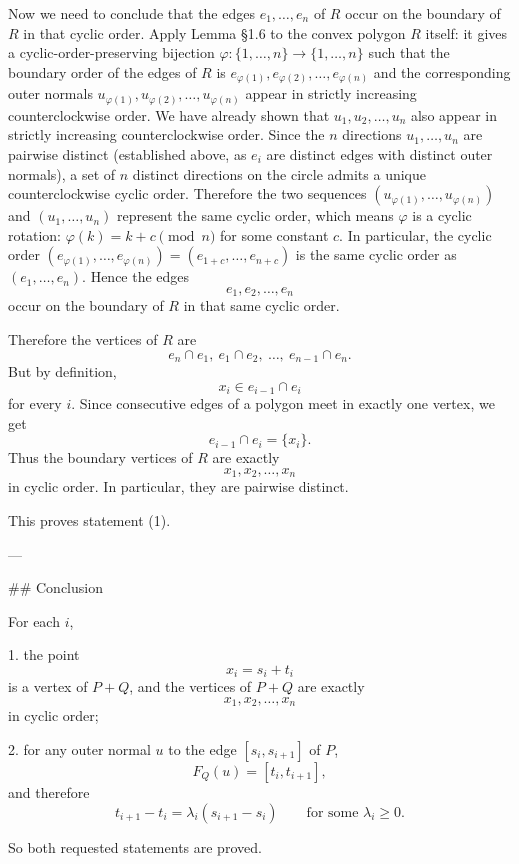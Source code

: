 Now we need to conclude that the edges \(e_1,\dots,e_n\) of \(R\) occur on the boundary of \(R\) in that cyclic order. Apply Lemma §1.6 to the convex polygon \(R\) itself: it gives a cyclic-order-preserving bijection \(\varphi\colon\{1,\dots,n\}\to\{1,\dots,n\}\) such that the boundary order of the edges of \(R\) is \(e_{\varphi(1)},e_{\varphi(2)},\dots,e_{\varphi(n)}\) and the corresponding outer normals \(u_{\varphi(1)},u_{\varphi(2)},\dots,u_{\varphi(n)}\) appear in strictly increasing counterclockwise order. We have already shown that \(u_1,u_2,\dots,u_n\) also appear in strictly increasing counterclockwise order. Since the \(n\) directions \(u_1,\dots,u_n\) are pairwise distinct (established above, as \(e_i\) are distinct edges with distinct outer normals), a set of \(n\) distinct directions on the circle admits a unique counterclockwise cyclic order. Therefore the two sequences \((u_{\varphi(1)},\dots,u_{\varphi(n)})\) and \((u_1,\dots,u_n)\) represent the same cyclic order, which means \(\varphi\) is a cyclic rotation: \(\varphi(k)=k+c\pmod n\) for some constant \(c\). In particular, the cyclic order \((e_{\varphi(1)},\dots,e_{\varphi(n)})=(e_{1+c},\dots,e_{n+c})\) is the same cyclic order as \((e_1,\dots,e_n)\). Hence the edges
\[
e_1,e_2,\dots,e_n
\]
occur on the boundary of \(R\) in that same cyclic order.

Therefore the vertices of \(R\) are
\[
e_n\cap e_1,\ e_1\cap e_2,\ \dots,\ e_{n-1}\cap e_n.
\]
But by definition,
\[
x_i\in e_{i-1}\cap e_i
\]
for every \(i\). Since consecutive edges of a polygon meet in exactly one vertex, we get
\[
e_{i-1}\cap e_i=\{x_i\}.
\]
Thus the boundary vertices of \(R\) are exactly
\[
x_1,x_2,\dots,x_n
\]
in cyclic order. In particular, they are pairwise distinct.

This proves statement (1).

---

## Conclusion

For each \(i\),

1. the point
   \[
   x_i=s_i+t_i
   \]
   is a vertex of \(P+Q\), and the vertices of \(P+Q\) are exactly
   \[
   x_1,x_2,\dots,x_n
   \]
   in cyclic order;

2. for any outer normal \(u\) to the edge \([s_i,s_{i+1}]\) of \(P\),
   \[
   F_Q(u)=[t_i,t_{i+1}],
   \]
   and therefore
   \[
   t_{i+1}-t_i=\lambda_i(s_{i+1}-s_i)
   \qquad\text{for some }\lambda_i\ge 0.
   \]

So both requested statements are proved.
